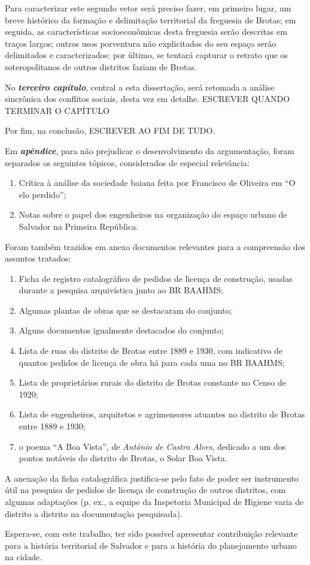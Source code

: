 Para caracterizar este segundo vetor será preciso fazer, em primeiro lugar, um breve histórico da formação e delimitação territorial da freguesia de Brotas; em seguida, as características socioeconômicas desta freguesia serão descritas em traços largos; outros usos porventura não explicitados do seu espaço serão delimitados e caracterizados; por último, se tentará capturar o retrato que os soteropolitanos de outros distritos faziam de Brotas. 

No \textbf{\textit{terceiro capítulo}}, central a esta dissertação, será retomada a análise sincrônica dos conflitos sociais, desta vez em detalhe. ESCREVER QUANDO TERMINAR O CAPÍTULO

Por fim, na conclusão, ESCREVER AO FIM DE TUDO.

Em \textbf{\textit{apêndice}}, para não prejudicar o desenvolvimento da argumentação, foram separados os seguintes tópicos, considerados de especial relevância:

\begin{enumerate}
\item Crítica à análise da sociedade baiana feita por Francisco de Oliveira em ``O elo perdido'';
\item Notas sobre o papel dos engenheiros na organização do espaço urbano de Salvador na Primeira República.
\end{enumerate}

Foram também trazidos em anexo documentos relevantes para a compreensão dos assuntos tratados:

\begin{enumerate}
\item Ficha de registro catalográfico de pedidos de licença de construção, usadas durante a pesquisa arquivística junto ao BR BAAHMS;
\item Algumas plantas de obras que se destacaram do conjunto;
\item Alguns documentos igualmente destacados do conjunto;
\item Lista de ruas do distrito de Brotas entre 1889 e 1930, com indicativo de quantos pedidos de licença de obra há para cada uma no BR BAAHMS;
\item Lista de proprietários rurais do distrito de Brotas constante no Censo de 1920;
\item Lista de engenheiros, arquitetos e agrimensores atuantes no distrito de Brotas entre 1889 e 1930;
\item o poema ``A Boa Vista'', de \textit{Antônio de Castro Alves}, dedicado a um dos pontos notáveis do distrito de Brotas, o Solar Boa Vista.
\end{enumerate}

A anexação da ficha catalográfica justifica-se pelo fato de poder ser instrumento útil na pesquisa de pedidos de licença de construção de outros distritos, com algumas adaptações (p. ex., a equipe da Inspetoria Municipal de Higiene varia de distrito a distrito na documentação pesquisada).

Espera-se, com este trabalho, ter sido possível apresentar contribuição relevante para a história territorial de Salvador e para a história do planejamento urbano na cidade.

